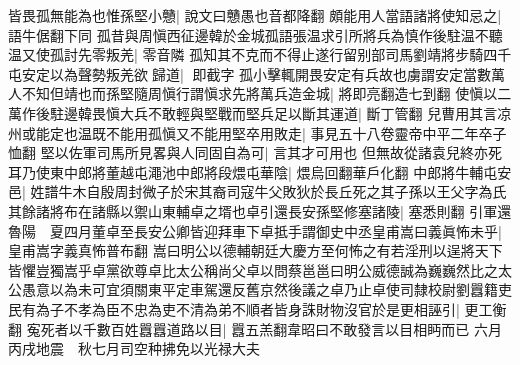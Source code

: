 皆畏孤無能為也惟孫堅小戇|{
	說文曰戇愚也音都降翻}
頗能用人當語諸將使知忌之|{
	語牛倨翻下同}
孤昔與周愼西征邊韓於金城孤語張温求引所將兵為慎作後駐温不聽温又使孤討先零叛羌|{
	零音隣}
孤知其不克而不得止遂行留别部司馬劉靖將步騎四千屯安定以為聲勢叛羌欲歸道|{
	即截字}
孤小擊輒開畏安定有兵故也虜謂安定當數萬人不知但靖也而孫堅隨周愼行謂愼求先將萬兵造金城|{
	將即亮翻造七到翻}
使愼以二萬作後駐邊韓畏愼大兵不敢輕與堅戰而堅兵足以斷其運道|{
	斷丁管翻}
兒曹用其言凉州或能定也温既不能用孤愼又不能用堅卒用敗走|{
	事見五十八卷靈帝中平二年卒子恤翻}
堅以佐軍司馬所見畧與人同固自為可|{
	言其才可用也}
但無故從諸袁兒終亦死耳乃使東中郎將董越屯澠池中郎將段煨屯華陰|{
	煨烏回翻華戶化翻}
中郎將牛輔屯安邑|{
	姓譜牛木自殷周封微子於宋其裔司寇牛父敗狄於長丘死之其子孫以王父字為氏}
其餘諸將布在諸縣以禦山東輔卓之壻也卓引還長安孫堅修塞諸陵|{
	塞悉則翻}
引軍還魯陽　夏四月董卓至長安公卿皆迎拜車下卓抵手謂御史中丞皇甫嵩曰義眞怖未乎|{
	皇甫嵩字義真怖普布翻}
嵩曰明公以德輔朝廷大慶方至何怖之有若淫刑以逞將天下皆懼豈獨嵩乎卓黨欲尊卓比太公稱尚父卓以問蔡邕邕曰明公威德誠為巍巍然比之太公愚意以為未可宜須關東平定車駕還反舊京然後議之卓乃止卓使司隸校尉劉囂籍吏民有為子不孝為臣不忠為吏不清為弟不順者皆身誅財物沒官於是更相誣引|{
	更工衡翻}
寃死者以千數百姓囂囂道路以目|{
	囂五羔翻韋昭曰不敢發言以目相眄而已}
六月丙戌地震　秋七月司空种拂免以光禄大夫

